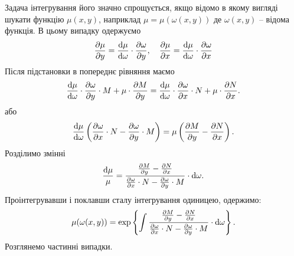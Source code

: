 Задача інтегрування його значно спрощується, якщо відомо в якому вигляді шукати функцію $\mu(x,y)$, наприклад $\mu = \mu(\omega(x,y))$ де $\omega(x,y)$ -- відома функція. В цьому випадку одержуємо
\begin{equation*}
	\frac{\partial \mu}{\partial y} = \frac{\mathop{}\!\mathrm{d} \mu}{\mathop{}\!\mathrm{d} \omega} \cdot \frac{\partial \omega}{\partial y}, \quad \frac{\partial \mu}{\partial x} = \frac{\mathop{}\!\mathrm{d} \mu}{\mathop{}\!\mathrm{d} \omega} \cdot \frac{\partial \omega}{\partial x}
\end{equation*}
Після підстановки в попереднє рівняння маємо
\begin{equation*}
	\frac{\mathop{}\!\mathrm{d} \mu}{\mathop{}\!\mathrm{d} \omega} \cdot \frac{\partial \omega}{\partial y} \cdot M + \mu \cdot \frac{\partial M}{\partial y} = \frac{\mathop{}\!\mathrm{d} \mu}{\mathop{}\!\mathrm{d} \omega} \cdot \frac{\partial \omega}{\partial x} \cdot N + \mu \cdot \frac{\partial N}{\partial x}.
\end{equation*}
або
\begin{equation*}
	\frac{\mathop{}\!\mathrm{d} \mu}{\mathop{}\!\mathrm{d} \omega} \left( \frac{\partial \omega}{\partial x} \cdot N - \frac{\partial \omega}{\partial y} \cdot M \right) = \mu \left( \frac{\partial M}{\partial y} - \frac{\partial N}{\partial x} \right).
\end{equation*}
Розділимо змінні
\begin{equation*}
	\frac{\mathop{}\!\mathrm{d} \mu}{\mu} = \frac{\frac{\partial M}{\partial y} - \frac{\partial N}{\partial x} }{\frac{\partial \omega}{\partial x} \cdot N - \frac{\partial \omega}{\partial y} \cdot M} \cdot \mathop{}\!\mathrm{d} \omega.
\end{equation*}
Проінтегрувавши і поклавши сталу інтегрування одиницею, одержимо:
\begin{equation*}
	\mu(\omega(x,y)) = \exp\left\{\int \frac{\frac{\partial M}{\partial y} - \frac{\partial N}{\partial x} }{\frac{\partial \omega}{\partial x} \cdot N - \frac{\partial \omega}{\partial y} \cdot M} \cdot \mathop{}\!\mathrm{d} \omega\right\}.
\end{equation*}
Розглянемо частинні випадки.
